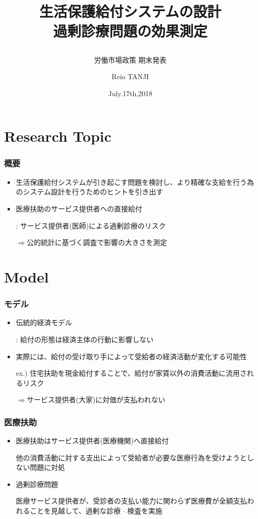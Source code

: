 \documentclass[dvipdfmx,14pt]{beamer}
\title{生活保護給付システムの設計 \\ 過剰診療問題の効果測定
\subtitle{労働市場政策 期末発表}}
\author{Reio TANJI}
\date{July.17th,2018}
\institute{Osaka University}
\begin{document}
\begin{frame}\frametitle{}
\titlepage
\end{frame}

\section{Research Topic}
\begin{frame}\frametitle{概要}

 \begin{itemize}
 
 \item 生活保護給付システムが引き起こす問題を検討し、より精確な支給を行う為のシステム設計を行うためのヒントを引き出す
 
 \item 医療扶助のサービス提供者への直接給付
 
 : サービス提供者(医師)による過剰診療のリスク
 
 $\Rightarrow$公的統計に基づく調査で影響の大きさを測定
 
 \end{itemize}

\end{frame}

\section{Model}
\begin{frame}\frametitle{モデル}

 \begin{itemize}
 
 \item 伝統的経済モデル
 
 : 給付の形態は経済主体の行動に影響しない
 
 \item 実際には、給付の受け取り手によって受給者の経済活動が変化する可能性
 
 ex.) 住宅扶助を現金給付することで、給付が家賃以外の消費活動に流用されるリスク
 
 $\Rightarrow$サービス提供者(大家)に対価が支払われない
 
 \end{itemize}

\end{frame}

\begin{frame}\frametitle{医療扶助}

 \begin{itemize}
 
 \item 医療扶助はサービス提供者(医療機関)へ直接給付
 
 他の消費活動に対する支出によって受給者が必要な医療行為を受けようとしない問題に対処
 
 \item 過剰診療問題
 
 医療サービス提供者が、受診者の支払い能力に関わらず医療費が全額支払われることを見越して、過剰な診療 $\cdot$ 検査を実施
 
 \end{itemize}

\end{frame}
\end{document}
